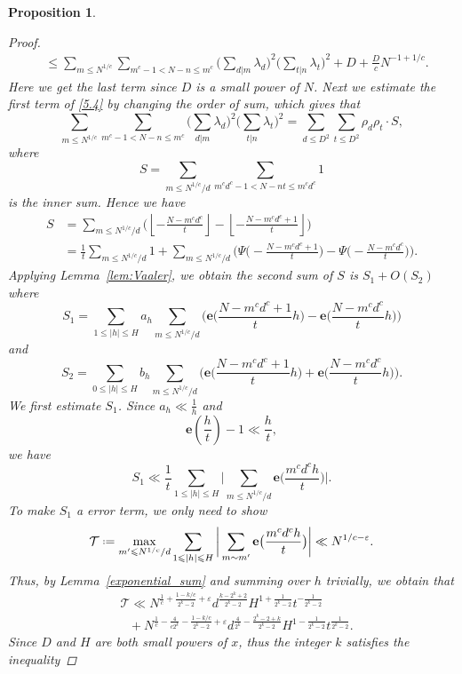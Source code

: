 \documentclass[12pt, reqno, twoside, letterpaper]{amsart}
\numberwithin{equation}{section}
\def\eps{\varepsilon}
\def\fl#1{\left\lfloor#1\right\rfloor}
\newcommand{\e}{\ensuremath{\mathbf{e}}}
\newcommand{\cT}{\ensuremath{\mathcal{T}}}
\theoremstyle{customthm}
\newtheorem{proposition}[X]{Proposition}
\theoremstyle{customrem}
\newcommand*{\defeq}{\mathrel{\vcenter{\baselineskip0.5ex \lineskiplimit0pt
			\hbox{\scriptsize.}\hbox{\scriptsize.}}}%
	=}
\begin{document}
\begin{proposition}
\begin{proof}
\begin{align}
&\leqslant \sum_{m\leqslant N^{1/c}}\sum_{m^c-1<N-n\leqslant m^c}\bigg( \sum_{d|m}\lambda_d \bigg)^2\bigg( \sum_{t|n}\lambda_t \bigg)^2 +D +\frac{D}{c}N^{-1+1/c}.
\end{align}
Here we get the last term since $D$ is a small power of $N$. Next we estimate the first term of \eqref{5.4} by changing the order of sum, which gives that 
$$
\sum_{m\leqslant N^{1/c}}\sum_{m^c-1<N-n\leqslant m^c}\bigg( \sum_{d|m}\lambda_d \bigg)^2\bigg( \sum_{t|n}\lambda_t \bigg)^2 = \sum_{d\leqslant D^2}\sum_{t\leqslant D^2}\rho_d\rho_t \cdot S,
$$
where
\begin{equation*}
	\label{5.5}
S=\sum_{m\leqslant N^{1/c}/d}\sum_{m^cd^c-1<N-nt\leqslant m^cd^c}1
\end{equation*}
is the inner sum. Hence we have
\begin{align*}
S&=\sum_{m\leqslant N^{1/c}/d}\bigg(  \fl{-\frac{N-m^cd^c}{t}} - \fl{-\frac{N-m^cd^c+1}{t}}\bigg)\\
&=\frac{1}{t}\sum_{m\leqslant N^{1/c}/d}1+\sum_{m\leqslant N^{1/c}/d}\bigg( \Psi\Big(-\frac{N-m^cd^c+1}{t}\Big) - \Psi\Big(-\frac{N-m^cd^c}{t}\Big) \bigg).
\end{align*}
Applying Lemma~\ref{lem:Vaaler}, we obtain the second sum of $S$ is $S_1 + O(S_2)$ where
$$
S_1 = \sum_{1\leqslant |h|\leqslant H}a_h\sum_{m\leqslant N^{1/c}/d}\bigg(\e\big(\frac{N-m^cd^c+1}{t}h\big) - \e\big(\frac{N-m^cd^c}{t}h\big)\bigg)
$$
and
$$
S_2 = \sum_{0\leqslant |h|\leqslant H}b_h\sum_{m\leqslant N^{1/c}/d}\bigg(\e\big(\frac{N-m^cd^c+1}{t}h\big) + \e\big(\frac{N-m^cd^c}{t}h\big)\bigg).
$$
We first estimate $S_1$. Since $a_h \ll \frac{1}{h}$ and 
$$
\e(\frac{h}{t})-1 \ll \frac{h}{t},
$$
we have
$$
S_1 \ll  \frac{1}{t}\sum_{1\leqslant |h|\leqslant H} \bigg| \sum_{m\leqslant N^{1/c}/d}\e\big(\frac{m^cd^ch}{t}\big) \bigg|.
$$
To make $S_1$ a error term, we only need to show
$$
\cT \defeq \max_{m' \leqslant N^{1/c}/d}\sum_{1\leqslant |h|\leqslant H}\bigg|\sum_{m\sim m'}\e\big(\frac{m^cd^ch}{t}\big)\bigg| \ll N^{1/c-\varepsilon}.
$$
Thus, by Lemma~\ref{exponential_sum} and summing over $h$ trivially, we obtain that 
\begin{align*}
&\cT\ll N^{\frac{1}{c}+\frac{1-k/c}{2^k-2}+\eps}d^{\frac{k-2^k+2}{2^k-2}}H^{1+\frac{1}{2^k-2}}t^{-\frac{1}{2^k-2}}\\
&\ \ \ +N^{\frac{1}{c}-\frac{4}{c2^k}-\frac{1-k/c}{2^k-2}+\eps}d^{\frac{4}{2^k}-\frac{2^k-2+k}{2^k-2}}H^{1-\frac{1}{2^k-2}}t^{\frac{1}{2^k-2}}.
\end{align*}
Since $D$ and $H$ are both small powers of $x$, thus the integer $k$ satisfies the inequality

\end{proof}
\end{proposition}
\end{document}
